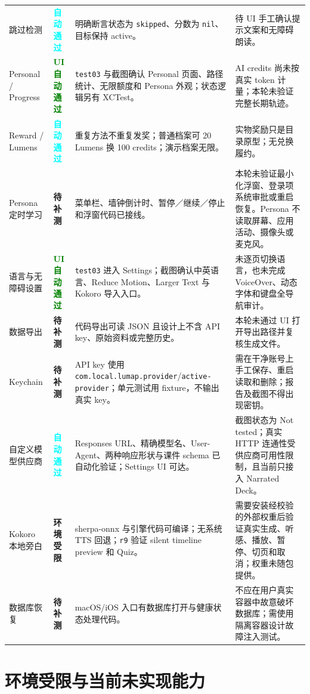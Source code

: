 \documentclass[10pt,a4paper,fontset=none]{ctexart}
\newcommand{\code}[1]{\begingroup\urlstyle{tt}\nolinkurl{#1}\endgroup}
\newcommand{\pill}[3]{\begingroup\setlength{\fboxsep}{3pt}\colorbox{#1}{\textcolor{#2}{\sffamily\bfseries\scriptsize #3}}\endgroup}
\newcommand{\UIPass}{\pill{GreenPale}{Green}{UI 自动通过}}
\newcommand{\AutoPass}{\pill{CyanPale}{Cyan}{自动通过}}
\newcommand{\Limited}{\pill{AmberPale}{Amber}{环境受限}}
\newcommand{\Pending}{\pill{AmberPale}{Amber}{待补测}}
\begin{document}
\begin{longtable}{@{}P{39mm}P{31mm}P{54mm}P{39mm}@{}}
跳过检测 & \AutoPass & 明确断言状态为 \code{skipped}、分数为 \code{nil}、目标保持 active。 & 待 UI 手工确认提示文案和无障碍朗读。 \\
Personal / Progress & \UIPass & \code{test03} 与截图确认 Personal 页面、路径统计、无限额度和 Persona 外观；状态逻辑另有 XCTest。 & AI credits 尚未按真实 token 计量；本轮未验证完整长期轨迹。 \\
Reward / Lumens & \AutoPass & 重复方法不重复发奖；普通档案可 20 Lumens 换 100 credits；演示档案无限。 & 实物奖励只是目录原型；无兑换履约。 \\
Persona 定时学习 & \Pending & 菜单栏、墙钟倒计时、暂停／继续／停止和浮窗代码已接线。 & 本轮未验证最小化浮窗、登录项系统审批或重启恢复。Persona 不读取屏幕、应用活动、摄像头或麦克风。 \\
语言与无障碍设置 & \UIPass & \code{test03} 进入 Settings；截图确认中英语言、Reduce Motion、Larger Text 与 Kokoro 导入入口。 & 未逐页切换语言，也未完成 VoiceOver、动态字体和键盘全导航审计。 \\
数据导出 & \Pending & 代码导出可读 JSON 且设计上不含 API key、原始资料或完整历史。 & 本轮未通过 UI 打开导出路径并复核生成文件。 \\
Keychain & \Pending & API key 使用 \code{com.local.lumap.provider}/\code{active-provider}；单元测试用 fixture，不输出真实 key。 & 需在干净账号上手工保存、重启读取和删除；报告及截图不得出现密钥。 \\
自定义模型供应商 & \AutoPass & Responses URL、精确模型名、User-Agent、两种响应形状与课件 schema 已自动化验证；Settings UI 可达。 & 截图状态为 Not tested；真实 HTTP 连通性受供应商可用性限制，且当前只接入 Narrated Deck。 \\
Kokoro 本地旁白 & \Limited & sherpa-onnx 与引擎代码可编译；无系统 TTS 回退；\code{r9} 验证 silent timeline preview 和 Quiz。 & 需要安装经校验的外部权重后验证真实生成、听感、播放、暂停、切页和取消；权重未随包提供。 \\
数据库恢复 & \Pending & macOS/iOS 入口有数据库打开与健康状态处理代码。 & 不应在用户真实容器中故意破坏数据库；需使用隔离容器设计故障注入测试。 \\
\end{longtable}
\normalsize

\section{环境受限与当前未实现能力}
\end{document}

